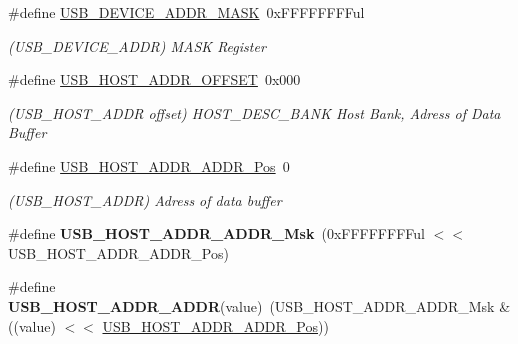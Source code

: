 \begin{DoxyCompactItemize}
\item 
\hypertarget{group___s_a_m_l21___u_s_b_ga8ee19e5cf7a507960a4467b29b526a51}{}\#define \hyperlink{group___s_a_m_l21___u_s_b_ga8ee19e5cf7a507960a4467b29b526a51}{U\+S\+B\+\_\+\+D\+E\+V\+I\+C\+E\+\_\+\+A\+D\+D\+R\+\_\+\+M\+A\+S\+K}~0x\+F\+F\+F\+F\+F\+F\+F\+Ful\label{group___s_a_m_l21___u_s_b_ga8ee19e5cf7a507960a4467b29b526a51}

\begin{DoxyCompactList}\small\item\em (U\+S\+B\+\_\+\+D\+E\+V\+I\+C\+E\+\_\+\+A\+D\+D\+R) M\+A\+S\+K Register \end{DoxyCompactList}\item 
\hypertarget{group___s_a_m_l21___u_s_b_gacbc434692759da5ecc14e43025383849}{}\#define \hyperlink{group___s_a_m_l21___u_s_b_gacbc434692759da5ecc14e43025383849}{U\+S\+B\+\_\+\+H\+O\+S\+T\+\_\+\+A\+D\+D\+R\+\_\+\+O\+F\+F\+S\+E\+T}~0x000\label{group___s_a_m_l21___u_s_b_gacbc434692759da5ecc14e43025383849}

\begin{DoxyCompactList}\small\item\em (U\+S\+B\+\_\+\+H\+O\+S\+T\+\_\+\+A\+D\+D\+R offset) H\+O\+S\+T\+\_\+\+D\+E\+S\+C\+\_\+\+B\+A\+N\+K Host Bank, Adress of Data Buffer \end{DoxyCompactList}\item 
\hypertarget{group___s_a_m_l21___u_s_b_ga608a4201f066a3b5f143967efd6b13b6}{}\#define \hyperlink{group___s_a_m_l21___u_s_b_ga608a4201f066a3b5f143967efd6b13b6}{U\+S\+B\+\_\+\+H\+O\+S\+T\+\_\+\+A\+D\+D\+R\+\_\+\+A\+D\+D\+R\+\_\+\+Pos}~0\label{group___s_a_m_l21___u_s_b_ga608a4201f066a3b5f143967efd6b13b6}

\begin{DoxyCompactList}\small\item\em (U\+S\+B\+\_\+\+H\+O\+S\+T\+\_\+\+A\+D\+D\+R) Adress of data buffer \end{DoxyCompactList}\item 
\hypertarget{group___s_a_m_l21___u_s_b_ga4e91d6769b2a2d693e253c9e17cef4be}{}\#define {\bfseries U\+S\+B\+\_\+\+H\+O\+S\+T\+\_\+\+A\+D\+D\+R\+\_\+\+A\+D\+D\+R\+\_\+\+Msk}~(0x\+F\+F\+F\+F\+F\+F\+F\+Ful $<$$<$ U\+S\+B\+\_\+\+H\+O\+S\+T\+\_\+\+A\+D\+D\+R\+\_\+\+A\+D\+D\+R\+\_\+\+Pos)\label{group___s_a_m_l21___u_s_b_ga4e91d6769b2a2d693e253c9e17cef4be}

\item 
\hypertarget{group___s_a_m_l21___u_s_b_ga6ff1917bce6751f0bc55a5d990a5de02}{}\#define {\bfseries U\+S\+B\+\_\+\+H\+O\+S\+T\+\_\+\+A\+D\+D\+R\+\_\+\+A\+D\+D\+R}(value)~(U\+S\+B\+\_\+\+H\+O\+S\+T\+\_\+\+A\+D\+D\+R\+\_\+\+A\+D\+D\+R\+\_\+\+Msk \& ((value) $<$$<$ \hyperlink{group___s_a_m_l21___u_s_b_ga608a4201f066a3b5f143967efd6b13b6}{U\+S\+B\+\_\+\+H\+O\+S\+T\+\_\+\+A\+D\+D\+R\+\_\+\+A\+D\+D\+R\+\_\+\+Pos}))\label{group___s_a_m_l21___u_s_b_ga6ff1917bce6751f0bc55a5d990a5de02}


\end{DoxyCompactItemize}
